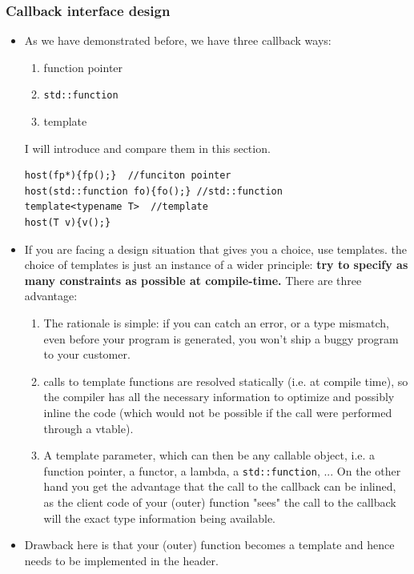 \documentclass[a4paper,11pt,twoside]{book}
\begin{document}
\subsubsection{Callback interface design}
\begin{itemize}
	\item As we have demonstrated before, we have three callback ways: 
	\begin{enumerate}
		\item function pointer
		\item \texttt{std::function}
		\item template
	\end{enumerate}
I will introduce and compare them in this section.
	
\begin{lstlisting} 
host(fp*){fp();}  //funciton pointer
host(std::function fo){fo();} //std::function
template<typename T>  //template
host(T v){v();}
\end{lstlisting}
	
	\item If you are facing a design situation that gives you a choice, use templates. the choice of templates is just an instance of a wider principle: \textbf{try to specify as many constraints as possible at compile-time.} There are three advantage:
	\begin{enumerate}
		\item The rationale is simple: if you can catch an error, or a type mismatch, even before your program is generated, you won't ship a buggy program to your customer.
		
		\item calls to template functions are resolved statically (i.e. at compile time), so the compiler has all the necessary information to optimize and possibly inline the code (which would not be possible if the call were performed through a vtable).
		
		\item A template parameter, which can then be any callable object, i.e. a function pointer, a functor, a lambda, a \texttt{std::function}, ...  On the other hand you get the advantage that the call to the callback can be inlined, as the client code of your (outer) function "sees" the call to the callback will the exact type information being available.
	\end{enumerate}

	\item Drawback here is that your (outer) function becomes a template and hence needs to be implemented in the header.
	

\end{itemize}
\end{document}
